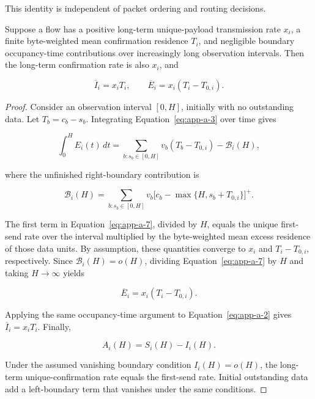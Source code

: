 This identity is independent of packet ordering and routing decisions.

\begin{lemma}
\label{lem:a-1}
Suppose a flow has a positive long-term unique-payload transmission rate \(x_i\), a finite byte-weighted mean confirmation residence \(T_i\), and negligible boundary occupancy-time contributions over increasingly long observation intervals. Then the long-term confirmation rate is also \(x_i\), and

\begin{equation}
\label{eq:app-a-6}
\overline I_i=x_iT_i,
\qquad
\overline E_i=x_i(T_i-T_{0,i}).
\end{equation}
\end{lemma}

\begin{proof} Consider an observation interval \([0,H]\), initially with no outstanding data. Let \(T_b=c_b-s_b\). Integrating Equation~\eqref{eq:app-a-3} over time gives

\begin{equation}
\label{eq:app-a-7}
\int_0^H E_i(t)\,dt
=
\sum_{b:s_b\in[0,H]}
v_b(T_b-T_{0,i})-\mathcal B_i(H),
\end{equation}

where the unfinished right-boundary contribution is

\begin{equation}
\label{eq:app-a-8}
\mathcal B_i(H)=
\sum_{b:s_b\in[0,H]}
v_b\big[c_b-\max\{H,s_b+T_{0,i}\}\big]^+.
\end{equation}

The first term in Equation~\eqref{eq:app-a-7}, divided by \(H\), equals the unique first-send rate over the interval multiplied by the byte-weighted mean excess residence of those data units. By assumption, these quantities converge to \(x_i\) and \(T_i-T_{0,i}\), respectively. Since \(\mathcal B_i(H)=o(H)\), dividing Equation~\eqref{eq:app-a-7} by \(H\) and taking \(H\to\infty\) yields

\[
\overline E_i=x_i(T_i-T_{0,i}).
\]

Applying the same occupancy-time argument to Equation~\eqref{eq:app-a-2} gives \(\overline I_i=x_iT_i\). Finally,

\[
A_i(H)=S_i(H)-I_i(H).
\]

Under the assumed vanishing boundary condition \(I_i(H)=o(H)\), the long-term unique-confirmation rate equals the first-send rate. Initial outstanding data add a left-boundary term that vanishes under the same conditions.
\end{proof}

